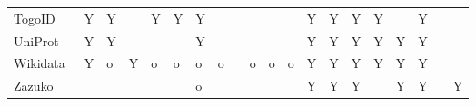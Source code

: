 \begin{table}
\begin{tabular}{llllllllllllllllllll}
                                 TogoID &              Y &        Y &       &          Y &          Y &        Y &                &               &         &         &         &                          Y &         Y &                 Y &                  Y &               &               Y &                &               \\
             UniProt~\cite{Bateman2021} &              Y &        Y &       &            &            &        Y &                &               &         &         &         &                          Y &         Y &                 Y &                  Y &             Y &               Y &                &               \\
        Wikidata~\cite{Waagmeester2020} &              Y &        o &     Y &          o &          o &        o &              o &               &       o &       o &       o &                          Y &         Y &                 Y &                  Y &             Y &               Y &                &               \\
                                 Zazuko &                &          &       &            &            &        o &                &               &         &         &         &                          Y &         Y &                 Y &                    &             Y &               Y &                &             Y \\
\bottomrule
\end{tabular}
\end{table}
